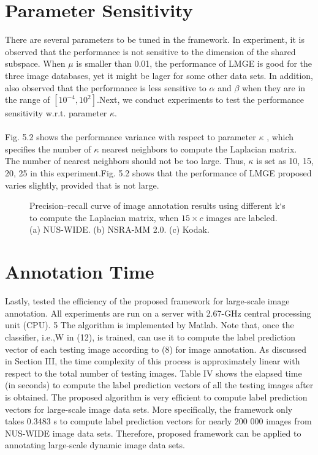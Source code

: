 \documentclass[a4paper,11pt]{report}
\begin{document}
\section{Parameter Sensitivity}
There are several parameters to be tuned in the framework.
In  experiment, it is observed that the performance is not sensitive
to the dimension of the shared subspace. When $\mu$ is smaller than 0.01, the performance of LMGE is good for the three image
databases, yet it might be lager for some other data sets. In addition,
also observed that the performance is less sensitive to $\alpha$ and $\beta$
when they are in the range of $[10^{-4},10^2]$.Next, we conduct
experiments to test the performance sensitivity w.r.t. parameter $\kappa$.
\paragraph{}
Fig. 5.2 shows the performance variance with respect to parameter $\kappa$
, which specifies the number of $\kappa$ nearest neighbors to
compute the Laplacian matrix. The number of nearest neighbors
should not be too large. Thus, $\kappa$ is set as {10, 15, 20, 25}
in this experiment.Fig. 5.2 shows that the performance
of LMGE proposed  varies slightly, provided that
is not large. 
\begin{figure} [ht]
 \centering

\caption{Precision–recall curve of image annotation results using different k`s to compute the Laplacian matrix, when $15\times c$ images are labeled. (a) NUS-WIDE.
(b) NSRA-MM 2.0. (c) Kodak.}
\end{figure}
\section{Annotation Time}

Lastly,  tested the efficiency of the proposed framework
for large-scale image annotation. All experiments are run
on a server with 2.67-GHz central processing unit (CPU). 5
The algorithm is implemented by Matlab. Note that, once the
classifier, i.e.,W in (12), is trained,  can use it to compute
the label prediction vector of each testing image according to
(8) for image annotation. As  discussed in Section III, the
time complexity of this process is approximately linear with
respect to the total number of testing images. Table IV shows
the elapsed time (in seconds) to compute the label prediction
vectors of all the testing images after is obtained. The proposed algorithm is very efficient to compute label prediction
vectors for large-scale image data sets. More specifically, the
framework only takes 0.3483 s to compute label prediction
vectors for nearly 200 000 images from NUS-WIDE image
data sets. Therefore, proposed framework can
be applied to annotating large-scale dynamic image data sets.
\begin{figure} [ht]
 \centering


\end{figure}
\end{document}
